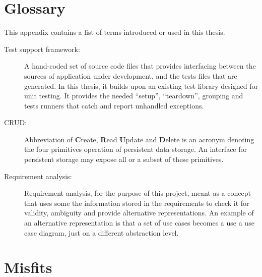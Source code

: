 \chapter{Glossary}
\label{appendix:glossary}
This appendix contains a list of terms introduced or used in this thesis.
\begin{description}
  \item[Test support framework:] A hand-coded set of source code files that provides interfacing between the sources of application under development, and the tests files that are generated. In this thesis, it builds upon an existing test library designed for unit testing. It provides the needed ``setup'', ``teardown'', grouping and tests runners that catch and report unhandled exceptions.
  \item[CRUD:] Abbreviation of \textbf{C}reate, \textbf{R}ead \textbf{U}pdate and \textbf{D}elete is an acronym denoting the four primitives operation of persistent data storage. An interface for persistent storage may expose all or a subset of these primitives.
  \item[Requirement analysis:] Requirement analysis, for the purpose of this project, meant as a concept that uses some the information stored in the requirements to check it for validity, ambiguity and provide alternative representations. An example of an alternative representation is that a set of use cases becomes a use a use case diagram, just on a different abstraction level.
\end{description}

\chapter{Misfits}

